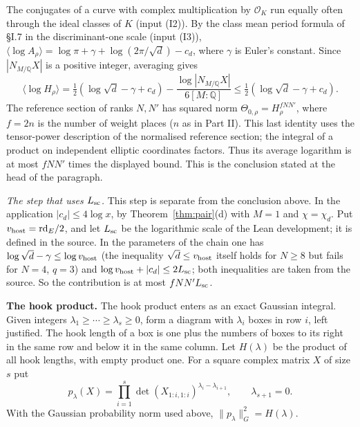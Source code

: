 \documentclass[11pt,letterpaper]{article}
\begin{document}
The conjugates of a curve with complex multiplication by $\mathcal O_K$
run equally often through the ideal classes of $K$ (input (I2)). By the class mean
period formula of \S I.7 in the discriminant-one scale (input (I3)),
$\langle\log A_\rho\rangle=\log\pi+\gamma+
 \log(2\pi/\sqrt d)-c_d$, where $\gamma$ is Euler's constant.
Since $|N_{M/\mathbb Q}X|$ is a positive integer, averaging gives
\begin{equation}\label{D:167}
 \langle\log H_\rho\rangle
 =\tfrac12(\log\sqrt d-\gamma+c_d)
 -\frac{\log |N_{M/\mathbb Q}X|}{6[M:\mathbb Q]}
 \le \tfrac12(\log\sqrt d-\gamma+c_d).
\end{equation}
The reference section of ranks $N,N'$ has squared norm
$\Theta_{0,\rho}=H_\rho^{fNN'}$, where $f=2n$ is the number of weight places ($n$ as in Part II).
This last identity uses the tensor-power description of the normalised
reference section; the integral of a product on independent elliptic
coordinates factors. Thus its average logarithm is at most $fNN'$
times the displayed bound. This is the conclusion stated at the head of the paragraph.

\emph{The step that uses $L_{\rm sc}$.} This step is separate from the conclusion above. In the application
$|c_d|\le4\log x$, by Theorem~\ref{thm:pair}(d) with $M=1$ and $\chi=\chi_d$. Put
$v_{\rm host}=\mathrm{rd}_E/2$, and let $L_{\rm sc}$ be the logarithmic scale of the Lean development; it
is defined in the source. In the parameters of the chain one has
$\log\sqrt d-\gamma\le\log v_{\rm host}$ (the inequality $\sqrt d\le v_{\rm host}$ itself holds for
$N\ge8$ but fails for $N=4$, $q=3$) and
$\log v_{\rm host}+|c_d|\le2L_{\rm sc}$; both inequalities are taken from the source. So the contribution
is at most $fNN' L_{\rm sc}$.

\textbf{The hook product.}
The hook product enters as an exact Gaussian integral. Given integers
$\lambda_1\ge\cdots\ge\lambda_s\ge0$, form a diagram with $\lambda_i$
boxes in row $i$, left justified. The hook length of a box is one plus
the numbers of boxes to its right in the same row and below it in the
same column. Let $H(\lambda)$ be the product of all hook lengths,
with empty product one. For a square complex matrix $X$ of size $s$ put
\begin{equation}\label{D:168}
 p_\lambda(X)=\prod_{i=1}^s
       \det(X_{1:i,1:i})^{\lambda_i-\lambda_{i+1}},
       \qquad \lambda_{s+1}=0 .
\end{equation}
With the Gaussian probability norm used above,
$\|p_\lambda\|_G^2=H(\lambda)$.
\end{document}
